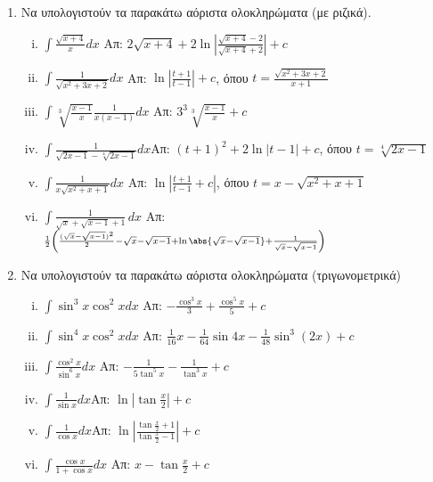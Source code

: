 \begin{enumerate}
  \item \label{ask:rizes} Να υπολογιστούν τα παρακάτω αόριστα ολοκληρώματα (με ριζικά).
    \begin{enumerate}[i)]
      \item $\int\frac{\sqrt{x+4}}{x}dx$
        \hfill Απ: $2\sqrt{x+4}+2\ln\left|\frac{\sqrt{x+4}-2}{\sqrt{x+4}+2}\right|+c$
      \item $\int\frac{1}{\sqrt{x^2+3x+2}}dx$
        \hfill Απ: $\ln\left|\frac{t+1}{t-1}\right|+c$, όπου 
        $t=\frac{\sqrt{x^2+3x+2}}{x+1}$
      \item $\int\sqrt[3]{\frac{x-1}{x}}\frac{1}{x(x-1)}dx$
        \hfill Απ: $3^3\sqrt[3]{\frac{x-1}{x}} +c$
      \item  $\int\frac{1}{\sqrt{2x-1}-\sqrt[4]{2x-1}}dx$\hfill Απ: $(t+1)^2
        +2\ln|t-1|+c$, όπου $t=\sqrt[4]{2x-1} \label{four} $
      \item  $\int\frac{1}{x\sqrt{x^2+x+1}}dx$
        \hfill Απ: $\ln\left|\frac{t+1}{t-1}+c\right|$, όπου $t=x-\sqrt{x^2+x+1}$
      \item $ \int \frac{1}{\sqrt{x} + \sqrt{x-1} + 1} \, dx$ \hfill Απ: $
        \scriptstyle{\frac{1}{2} \left(\frac{(\sqrt{x} - \sqrt{x-1})^{2}}{2} -
            \sqrt{x} - \sqrt{x-1} + \ln{\abs{\sqrt{x} - \sqrt{x-1}}} + \frac{1}{\sqrt{x}
        - \sqrt{x-1}} \right)} $
    \end{enumerate}

  \item\label{ask:trig} Να υπολογιστούν τα παρακάτω αόριστα ολοκληρώματα 
    (τριγωνομετρικά)
    \begin{enumerate}[i)]
      \item $\int\sin^3x\cos^2xdx$
        \hfill Απ: $-\frac{\cos^3x}{3}+\frac{\cos^5x}{5}+c$
      \item $\int\sin^4x\cos^2xdx$
        \hfill Απ: $\frac{1}{16}x-\frac{1}{64}\sin 4x-\frac{1}{48}\sin^3{(2x)+c}$
      \item $\int\frac{\cos^2x}{\sin^6x}dx$
        \hfill Απ: $-\frac{1}{5\tan^5x}-\frac{1}{\tan^3x}+c$
      \item $\int\frac{1}{\sin x}dx$\hfill Απ:
        $\ln\left|\tan\frac{x}{2}\right|+c$
      \item $\int\frac{1}{\cos x}dx$\hfill Απ:
        $\ln\left|\frac{\tan\frac{x}{2}+1}{\tan\frac{x}{2}-1}\right|+c$
      \item $\int\frac{\cos x}{1+\cos x}dx$
        \hfill Απ: $x-\tan\frac{x}{2}+c$
    \end{enumerate}
\end{enumerate}



